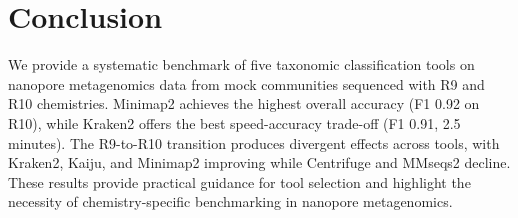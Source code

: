 \documentclass[11pt]{article}
\begin{document}
\section{Conclusion}

We provide a systematic benchmark of five taxonomic classification tools on nanopore metagenomics data from mock communities sequenced with R9 and R10 chemistries. Minimap2 achieves the highest overall accuracy (F1 0.92 on R10), while Kraken2 offers the best speed-accuracy trade-off (F1 0.91, 2.5 minutes). The R9-to-R10 transition produces divergent effects across tools, with Kraken2, Kaiju, and Minimap2 improving while Centrifuge and MMseqs2 decline. These results provide practical guidance for tool selection and highlight the necessity of chemistry-specific benchmarking in nanopore metagenomics.



\end{document}
